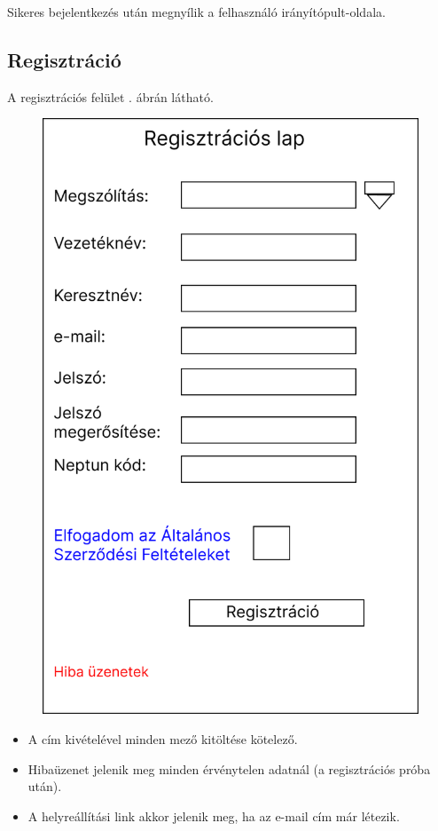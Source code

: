 \documentclass[a4paper,12pt]{article}
\begin{document}
Sikeres bejelentkezés után megnyílik a felhasználó irányítópult-oldala.

\subsection{Regisztráció}

A regisztrációs felület . ábrán látható.

\begin{figure}
	\centering
	\includegraphics[width=\textwidth]{images/Web_pages/Registration.jpg}
	\caption{}
	\label{fig:Registration}
\end{figure}

\begin{itemize}
	\item A cím kivételével minden mező kitöltése kötelező.
	\item Hibaüzenet jelenik meg minden érvénytelen adatnál (a regisztrációs próba után).
	\item A helyreállítási link akkor jelenik meg, ha az e-mail cím már létezik.
\end{itemize}
\end{document}
